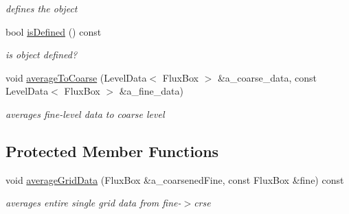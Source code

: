 \begin{DoxyCompactItemize}
\begin{DoxyCompactList}\small\item\em defines the object \end{DoxyCompactList}\item 
\hypertarget{class_coarse_average_edge_acb4c74b4b3af18340fffd63b9e088efe}{bool \hyperlink{class_coarse_average_edge_acb4c74b4b3af18340fffd63b9e088efe}{is\-Defined} () const }\label{class_coarse_average_edge_acb4c74b4b3af18340fffd63b9e088efe}

\begin{DoxyCompactList}\small\item\em is object defined? \end{DoxyCompactList}\item 
\hypertarget{class_coarse_average_edge_a66df1f9dfcd7c36e5f03c777ad3889fb}{void \hyperlink{class_coarse_average_edge_a66df1f9dfcd7c36e5f03c777ad3889fb}{average\-To\-Coarse} (Level\-Data$<$ Flux\-Box $>$ \&a\-\_\-coarse\-\_\-data, const Level\-Data$<$ Flux\-Box $>$ \&a\-\_\-fine\-\_\-data)}\label{class_coarse_average_edge_a66df1f9dfcd7c36e5f03c777ad3889fb}

\begin{DoxyCompactList}\small\item\em averages fine-\/level data to coarse level \end{DoxyCompactList}\end{DoxyCompactItemize}
\subsection*{Protected Member Functions}
\begin{DoxyCompactItemize}
\item 
\hypertarget{class_coarse_average_edge_a9da8d288b5030bce697f2a862e2e0732}{void \hyperlink{class_coarse_average_edge_a9da8d288b5030bce697f2a862e2e0732}{average\-Grid\-Data} (Flux\-Box \&a\-\_\-coarsened\-Fine, const Flux\-Box \&fine) const }\label{class_coarse_average_edge_a9da8d288b5030bce697f2a862e2e0732}

\begin{DoxyCompactList}\small\item\em averages entire single grid data from fine-\/$>$crse \end{DoxyCompactList}\end{DoxyCompactItemize}
